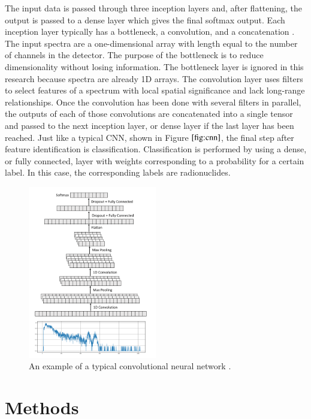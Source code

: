\documentclass[fleqn]{anstrans}
\begin{document}
The input data is passed through three inception layers and, after flattening, the output is passed to a dense layer which gives the final softmax output. 
Each inception layer typically has a bottleneck, a convolution, and a 
concatenation \cite{szegedyGoingDeeperConvolutions2014,szegedyRethinkingInceptionArchitecture2015}.
The input spectra are a one-dimensional array with length equal to the number of channels in the detector. The purpose of the bottleneck is to reduce dimensionality without losing information. The bottleneck layer is ignored in this research because spectra are already 1D arrays.   
The convolution layer uses filters to select features of a spectrum with local spatial significance and lack long-range relationships. 
Once the convolution has been done with several filters in parallel, the outputs of each of those convolutions are concatenated into a single tensor and passed to the next inception layer, or dense layer if the last layer has been reached. 
Just like a typical CNN, shown in Figure $\ref{fig:cnn}$, the final step after feature identification is classification. 
Classification is performed by using a dense, or fully connected, layer with weights corresponding to a probability for a certain label. 
In this case, the corresponding labels are radionuclides.

\begin{figure}[ht]
	\centering
	\includegraphics[width=0.5\textwidth]{../figures/cnn-figure.png}
	\caption{An example of a typical convolutional neural network \cite{kamudaComparisonMachineLearning2018a}.}
	\label{fig:cnn}
\end{figure}

\section{Methods}
\end{document}
